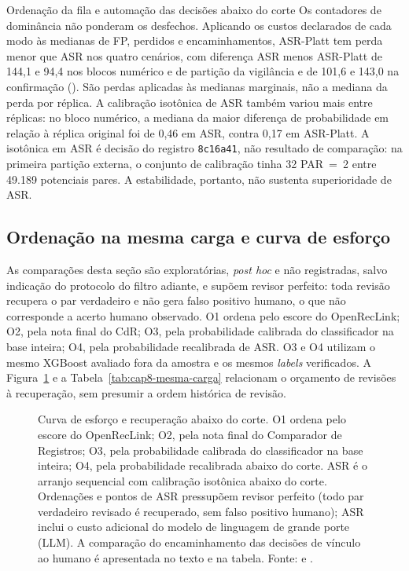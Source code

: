 \begin{chapter}{Ordenação da fila e automação das decisões abaixo do corte}
Os contadores de dominância não ponderam os desfechos. Aplicando os custos declarados de cada modo às medianas de FP, perdidos e encaminhamentos, ASR-Platt tem perda menor que ASR nos quatro cenários, com diferença ASR menos ASR-Platt de 144,1 e 94,4 nos blocos numérico e de partição da vigilância e de 101,6 e 143,0 na confirmação (). São perdas aplicadas às medianas marginais, não a mediana da perda por réplica. A calibração isotônica de ASR também variou mais entre réplicas: no bloco numérico, a mediana da maior diferença de probabilidade em relação à réplica original foi de 0,46 em ASR, contra 0,17 em ASR-Platt. A isotônica em ASR é decisão do registro \texttt{8c16a41}, não resultado de comparação: na primeira partição externa, o conjunto de calibração tinha 32 PAR~=~2 entre 49.189 potenciais pares. A estabilidade, portanto, não sustenta superioridade de ASR.

\subsection{Ordenação na mesma carga e curva de esforço}\label{sec:e4-mesma-carga}

As comparações desta seção são exploratórias, \textit{post hoc} e não registradas, salvo indicação do protocolo do filtro adiante, e supõem revisor perfeito: toda revisão recupera o par verdadeiro e não gera falso positivo humano, o que não corresponde a acerto humano observado. O1 ordena pelo escore do OpenRecLink; O2, pela nota final do CdR; O3, pela probabilidade calibrada do classificador na base inteira; O4, pela probabilidade recalibrada de ASR. O3 e O4 utilizam o mesmo XGBoost avaliado fora da amostra e os mesmos \textit{labels} verificados. A Figura~\ref{fig:cap8-curva-esforco} e a Tabela~\ref{tab:cap8-mesma-carga} relacionam o orçamento de revisões à recuperação, sem presumir a ordem histórica de revisão.

\begin{figure}[!htbp]
\centering
\resizebox{\linewidth}{!}{}
\caption{Curva de esforço e recuperação abaixo do corte. O1 ordena pelo escore do OpenRecLink; O2, pela nota final do Comparador de Registros; O3, pela probabilidade calibrada do classificador na base inteira; O4, pela probabilidade recalibrada abaixo do corte. ASR é o arranjo sequencial com calibração isotônica abaixo do corte. Ordenações e pontos de ASR pressupõem revisor perfeito (todo par verdadeiro revisado é recuperado, sem falso positivo humano); ASR inclui o custo adicional do modelo de linguagem de grande porte (LLM). A comparação do encaminhamento das decisões de vínculo ao humano é apresentada no texto e na tabela. Fonte: \protect{} e \protect{}.}
\label{fig:cap8-curva-esforco}
\end{figure}


\end{chapter}
